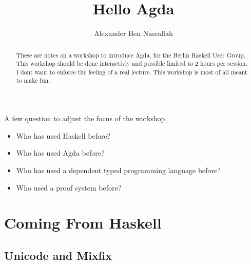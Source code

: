 \documentclass[12pt]{article}
\title{Hello Agda}
\author{Alexander Ben Nasrallah}
\begin{document}
\maketitle{}
\begin{abstract}
  These are notes on a workshop to introduce Agda, for the Berlin Haskell User Group.
  This workshop should be done interactivly and possible limited to 2 hours
  per session. I dont want to enforce the feeling of a real lecture.
  This workshop is most of all meant to make fun.
\end{abstract}

\tableofcontents{}\newpage{}

A few question to adjust the focus of the workshop.
\begin{itemize}
  \item Who has used Haskell before?
  \item Who has used Agda before?
  \item Who has used a dependent typed programming language before?
  \item Who used a proof system before?
\end{itemize}






\section{Coming From Haskell}
\subsection{Unicode and Mixfix}


\printbibliography{}
\end{document}
